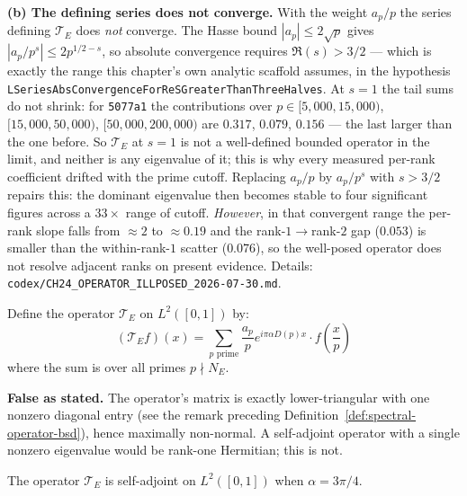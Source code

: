 \begin{remark}
\smallskip
\textbf{(b) The defining series does not converge.}
With the weight $a_p/p$ the series defining $\mathcal{T}_E$ does
\emph{not} converge.  The Hasse bound $|a_p| \le 2\sqrt{p}$ gives
$|a_p/p^s| \le 2p^{1/2-s}$, so absolute convergence requires $\Re(s) > 3/2$ ---
which is exactly the range this chapter's own analytic scaffold assumes, in the
hypothesis \texttt{LSeriesAbsConvergenceForReSGreaterThanThreeHalves}.  At
$s=1$ the tail sums do not shrink: for \texttt{5077a1} the contributions over
$p \in [5{,}000, 15{,}000)$, $[15{,}000, 50{,}000)$, $[50{,}000, 200{,}000)$ are
$0.317$, $0.079$, $0.156$ --- the last larger than the one before.  So
$\mathcal{T}_E$ at $s=1$ is not a well-defined bounded operator in the limit,
and neither is any eigenvalue of it; this is why every measured per-rank
coefficient drifted with the prime cutoff.  Replacing $a_p/p$ by $a_p/p^{s}$
with $s>3/2$ repairs this: the dominant eigenvalue then becomes stable to four
significant figures across a $33\times$ range of cutoff.  \emph{However}, in
that convergent range the per-rank slope falls from $\approx 2$ to $\approx
0.19$ and the rank-$1\to$rank-$2$ gap ($0.053$) is smaller than the
within-rank-$1$ scatter ($0.076$), so the well-posed operator does not resolve
adjacent ranks on present evidence.  Details:
\texttt{codex/CH24\_OPERATOR\_ILLPOSED\_2026-07-30.md}.
\end{remark}

\begin{defn}\label{def:spectral-operator-bsd}
Define the operator $\mathcal{T}_E$ on $L^2([0,1])$ by:
\begin{equation}
(\mathcal{T}_E f)(x) = \sum_{p \text{ prime}} \frac{a_p}{p} e^{i\pi\alpha D(p) x} \cdot f\left(\frac{x}{p}\right)
\end{equation}
where the sum is over all primes $p \nmid N_E$.
\end{defn}

\begin{warning}
\textbf{False as stated.}  The operator's matrix is exactly lower-triangular
with one nonzero diagonal entry (see the remark preceding
Definition~\ref{def:spectral-operator-bsd}), hence maximally non-normal.  A
self-adjoint operator with a single nonzero eigenvalue would be rank-one
Hermitian; this is not.
\end{warning}

\begin{theorem}[Self-Adjointness at $\alpha = 3\pi/4$]\label{thm:self-adjoint-bsd}
The operator $\mathcal{T}_E$ is self-adjoint on $L^2([0,1])$ when $\alpha = 3\pi/4$.
\end{theorem}

